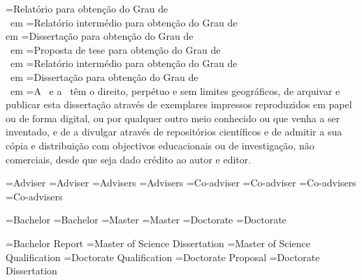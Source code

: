 \UNL@dissertationstr[bsc,pt]={Relatório para obtenção do Grau de \\\UNL@degree\ em \@majorfield}
\UNL@dissertationstr[prepmsc,pt]={Relatório intermédio para obtenção do Grau de \\\UNL@degree em \@majorfield}
\UNL@dissertationstr[msc,pt]={Dissertação para obtenção do Grau de \\\UNL@degree\ em \@majorfield}
\UNL@dissertationstr[propphd,pt]={Proposta de tese para obtenção do Grau de \\\UNL@degree\ em \@majorfield}
\UNL@dissertationstr[prepphdpt,pt]={Relatório intermédio para obtenção do Grau de \\\UNL@degree\ em \@majorfield}
\UNL@dissertationstr[phd,pt]={Dissertação para obtenção do Grau de \\\UNL@degree\ em \@majorfield}
\UNL@copyrighttext[pt]={A \@faculty\ e a \@university\ têm o direito, perpétuo e sem limites geográficos, de arquivar e publicar esta dissertação através de exemplares impressos reproduzidos em papel ou de forma digital, ou por qualquer outro meio conhecido ou que venha a ser inventado, e de a divulgar através de repositórios científicos e de admitir a sua cópia e distribuição com objectivos educacionais ou de investigação, não comerciais, desde que seja dado crédito ao autor e editor.}




\UNL@adviserstr[1,m,en]={Adviser}
\UNL@adviserstr[1,f,en]={Adviser}
\UNL@adviserstr[2,m,en]={Advisers}
\UNL@adviserstr[2,f,en]={Advisers}
\UNL@coadviserstr[1,m,en]={Co-adviser}
\UNL@coadviserstr[1,f,en]={Co-adviser}
\UNL@coadviserstr[2,m,en]={Co-advisers}
\UNL@coadviserstr[2,f,en]={Co-advisers}

\UNL@degreestr[bsc,m,en]={Bachelor}
\UNL@degreestr[bsc,f,en]={Bachelor}
\UNL@degreestr[msc,m,en]={Master}
\UNL@degreestr[msc,f,en]={Master}
\UNL@degreestr[phd,m,en]={Doctorate}
\UNL@degreestr[phd,f,en]={Doctorate}

\UNL@doctypestr[bsc,en]={Bachelor Report}
\UNL@doctypestr[msc,en]={Master of Science Dissertation}
\UNL@doctypestr[prepmsc,en]={Master of Science Qualification}
\UNL@doctypestr[prepphd,en]={Doctorate Qualification}
\UNL@doctypestr[propphd,en]={Doctorate Proposal}
\UNL@doctypestr[phd,en]={Doctorate Dissertation}

